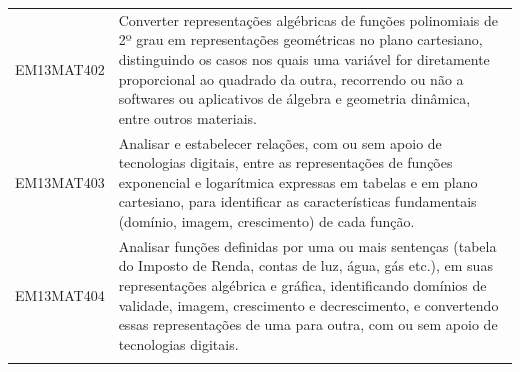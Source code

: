 \documentclass[12pt]{extarticle}
\begin{document}
\begin{longtable}{ll}
EM13MAT402 & Converter representações algébricas de funções polinomiais de 2º grau em representações geométricas no plano cartesiano, distinguindo os casos nos quais uma variável for diretamente proporcional ao quadrado da outra, recorrendo ou não a softwares ou aplicativos de álgebra e geometria dinâmica, entre outros materiais.                                                                                                                                                                                                                                                                                                                                                                                                                                                                                        \\
\rowcolor[HTML]{E0F7FA} 
EM13MAT403 & Analisar e estabelecer relações, com ou sem apoio de tecnologias digitais, entre as representações de funções exponencial e logarítmica expressas em tabelas e em plano cartesiano, para identificar as características fundamentais (domínio, imagem, crescimento) de cada função.                                                                                                                                                                                                                                                                                                                                                                                                                                                                                                                                   \\
\rowcolor[HTML]{FFF} 
EM13MAT404 & Analisar funções definidas por uma ou mais sentenças (tabela do Imposto de Renda, contas de luz, água, gás etc.), em suas representações algébrica e gráfica, identificando domínios de validade, imagem, crescimento e decrescimento, e convertendo essas representações de uma para outra, com ou sem apoio de tecnologias digitais.                                                                                                                                                                                                                                                                                                                                                                                                                                                                                \\
\rowcolor[HTML]{E0F7FA} 

\end{longtable}
\end{document}
